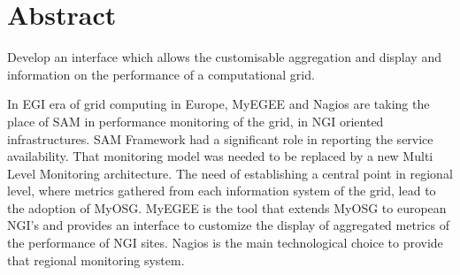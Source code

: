 \section*{Abstract}
Develop an interface which allows the customisable aggregation and display and
information on the performance of a computational grid.

In EGI era of grid computing in Europe, MyEGEE and Nagios are taking the place
of SAM in performance monitoring of the grid, in NGI oriented infrastructures.
SAM Framework had a significant role in reporting the service availability.
That monitoring model was needed to be replaced by a new Multi Level Monitoring
architecture. The need of establishing a central point in regional level, where
metrics gathered from each information system of the grid, lead to the adoption
of MyOSG. MyEGEE is the tool that extends MyOSG to european NGI's and provides
an interface to customize the display of aggregated metrics of the performance
of NGI sites. Nagios is the main technological choice to provide that regional
monitoring system.